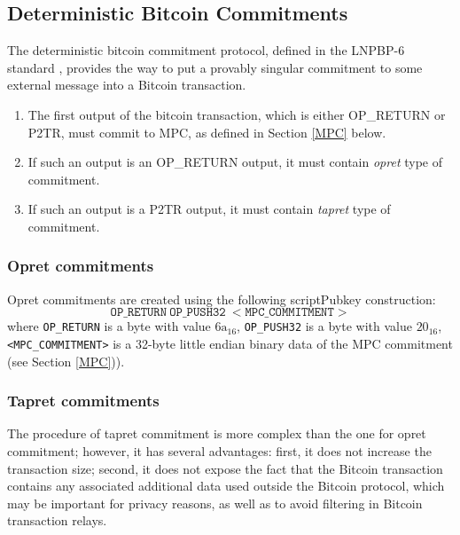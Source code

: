 \documentclass[9pt,oneside]{amsart}
\begin{document}
\begin{multicols}{2}
\subsection{Deterministic Bitcoin Commitments}\label{DBC}

The deterministic bitcoin commitment protocol, defined in the LNPBP-6 standard \cite{LNPBP6},
provides the way to put a provably singular commitment to some external message
into a Bitcoin transaction.

\begin{enumerate}
\item The first output of the bitcoin transaction, which is either OP\_RETURN or P2TR,
    must commit to MPC, as defined in Section \ref{MPC} below.
\item If such an output is an OP\_RETURN output, it must contain \emph{opret} type of commitment.
\item If such an output is a P2TR output, it must contain \emph{tapret} type of commitment.
\end{enumerate}

\subsubsection{Opret commitments}\label{Opret}

Opret commitments are created using the following \textsf{scriptPubkey} construction:
\noindent
\begin{equation}
    \mathtt{OP\_RETURN\ OP\_PUSH32\ <MPC\_COMMITMENT>}
\end{equation}
where \verb|OP_RETURN| is a byte with value $\mathrm{6a}_{16}$,
\verb|OP_PUSH32| is a byte with value $20_{16}$,
\verb|<MPC_COMMITMENT>| is a 32-byte little endian binary data of the MPC commitment
(see Section \ref{MPC})).

\subsubsection{Tapret commitments}\label{Tapret}

The procedure of tapret commitment is more complex than the one for opret commitment;
however, it has several advantages:
first, it does not increase the transaction size;
second, it does not expose the fact that the Bitcoin transaction contains any associated
additional data used outside the Bitcoin protocol, which may be important for privacy reasons,
as well as to avoid filtering in Bitcoin transaction relays.


\end{multicols}
\end{document}
